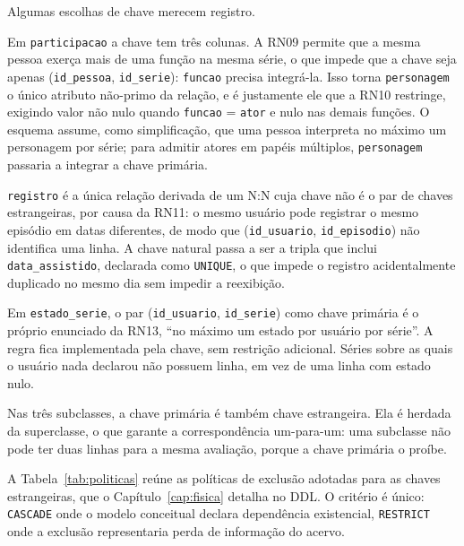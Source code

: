 \documentclass[a4paper,12pt,oneside,openany]{book}
\newcommand{\id}[1]{\texttt{#1}}
\begin{document}
Algumas escolhas de chave merecem registro.

Em \id{participacao} a chave tem três colunas. A RN09 permite que a mesma pessoa
exerça mais de uma função na mesma série, o que impede que a chave seja apenas
(\id{id\_pessoa}, \id{id\_serie}): \id{funcao} precisa integrá-la. Isso torna
\id{personagem} o único atributo não-primo da relação, e é justamente ele que a RN10
restringe, exigindo valor não nulo quando \id{funcao} = \id{ator} e nulo nas demais
funções. O esquema assume, como simplificação, que uma pessoa interpreta no máximo um
personagem por série; para admitir atores em papéis múltiplos, \id{personagem}
passaria a integrar a chave primária.

\id{registro} é a única relação derivada de um N:N cuja chave não é o par de chaves
estrangeiras, por causa da RN11: o mesmo usuário pode registrar o mesmo episódio em
datas diferentes, de modo que (\id{id\_usuario}, \id{id\_episodio}) não identifica
uma linha. A chave natural passa a ser a tripla que inclui \id{data\_assistido},
declarada como \id{UNIQUE}, o que impede o registro acidentalmente duplicado no mesmo
dia sem impedir a reexibição.

Em \id{estado\_serie}, o par (\id{id\_usuario}, \id{id\_serie}) como chave primária
é o próprio enunciado da RN13, ``no máximo um estado por usuário por série''. A regra
fica implementada pela chave, sem restrição adicional. Séries sobre as quais o usuário
nada declarou não possuem linha, em vez de uma linha com estado nulo.

Nas três subclasses, a chave primária é também chave estrangeira. Ela é herdada da
superclasse, o que garante a correspondência um-para-um: uma subclasse não pode ter
duas linhas para a mesma avaliação, porque a chave primária o proíbe.

A Tabela~\ref{tab:politicas} reúne as políticas de exclusão adotadas para as chaves
estrangeiras, que o Capítulo~\ref{cap:fisica} detalha no DDL. O critério é único:
\id{CASCADE} onde o modelo conceitual declara dependência existencial,
\id{RESTRICT} onde a exclusão representaria perda de informação do acervo.
\end{document}
